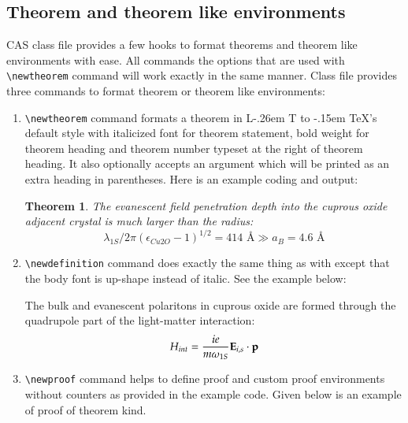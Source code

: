 \documentclass[a4paper,12pt]{article}
\makeatletter
\DeclareRobustCommand{\LaTeX}{L\kern-.26em%
        {\sbox\z@ T%
         \vbox to\ht\z@{\hbox{\check@mathfonts
           \fontsize\sf@size\z@
           \math@fontsfalse\selectfont
          A\,}%
         \vss}%
        }%
     \kern-.15em%
    \TeX}
\makeatother
\begin{document}
\subsection{Theorem and theorem like environments}

CAS class file provides a few hooks to format theorems and
theorem like environments with ease. All commands the
options that are used with \verb+\newtheorem+ command will work
exactly in the same manner. Class file provides three
commands to format theorem or theorem like environments:

\begin{enumerate}
\item \verb+\newtheorem+ command formats a theorem in
\LaTeX's default style with italicized font for theorem
statement, bold weight for theorem heading and theorem
number typeset at the right of theorem heading. It also
optionally accepts an argument which will be printed as an
extra heading in parentheses. Here is an example coding and
output:

\begin{vquote}
\newtheorem{theorem}{Theorem}
\begin{theorem}\label{thm}
 The \WGM evanescent field penetration depth into the 
 cuprous oxide adjacent crystal is much larger than the 
 \QE radius: 
 \begin{equation*}
  \lambda_{1S}/2 \pi \left({\epsilon_{Cu2O}-1}
    \right)^{1/2} = 414 \mbox{ \AA} \gg a_B = 4.6 
    \mbox{ \AA}  
 \end{equation*}
\end{theorem}
\end{vquote}

\item \verb+\newdefinition+ command does exactly the same
thing as with except that the body font is up-shape instead
of italic. See the example below:

\begin{vquote}
\begin{definition}
 The bulk and evanescent polaritons in cuprous oxide
 are formed through the quadrupole part of the light-matter
 interaction:
 \begin{equation*}
  H_{int} = \frac{i e }{m \omega_{1S}} {\bf E}_{i,s} 
    \cdot {\bf p}
 \end{equation*}
\end{definition}
\end{vquote}

\item \verb+\newproof+ command helps to define proof and
custom proof environments without counters as provided in
the example code. Given below is an example of proof of
theorem kind.


\end{enumerate}
\end{document}
